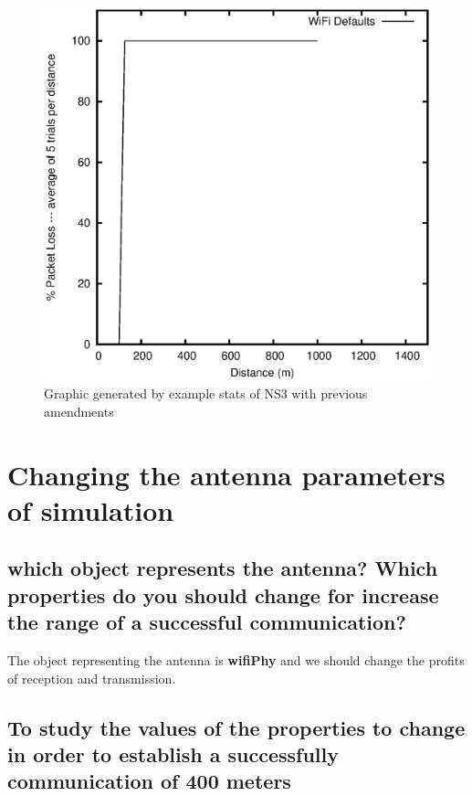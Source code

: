 \documentclass[a4paper,10pt]{article}
\begin{document}
\begin{figure}[h]
        	\centering
    \includegraphics[scale=0.60]{wifi-default.eps}
    \caption{Graphic generated by example stats of NS3 with previous amendments}
    \label{fig:inicio}
        \end{figure}


\section{Changing the antenna parameters of simulation}

\subsection{which object represents the antenna? Which properties do you should change for increase the range
of a successful communication?}

\singlespacing
The object representing the antenna is \textbf{wifiPhy} and we should change the profits of reception and transmission.

\subsection{To study the values of the properties to change in order to establish a successfully communication
of 400 meters}
\end{document}
